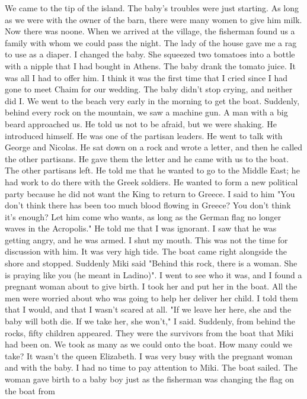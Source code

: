 We came to the tip of the island.
The baby's troubles were 
just starting.
As long as we were with the owner of the barn, there 
were many women to give him milk.
Now there was noone.
When we arrived 
at the village, the fisherman found us a family with whom we could pass 
the night.
The lady of the house gave me a rag to use as a diaper.
I 
changed the baby.
She squeezed two tomatoes into a bottle with a nipple 
that I had bought in Athens.
The baby drank the tomato juice.
It was all 
I had to offer him.
I think it was the first time that I cried since I 
had gone to meet Chaim for our wedding.
The baby didn't stop crying, and 
neither did I. 
We went to the beach very early in the morning to get the boat.
Suddenly, behind every rock on the mountain, we saw a machine gun.
A man with 
a big beard approached us.
He told us not to be afraid, but we were shaking.
He introduced himself.
He was one of the partisan leaders.
He went to talk with George and Nicolas.
He sat down on a rock and wrote a letter, and then he called the other partisans.
He gave them the letter 
and he came with us to the boat.
The other partisans left.
He told me that he wanted to go to the Middle East; he had work to do 
there with the Greek soldiers.
He wanted to form a new political party 
because he did not want the King to return to Greece.
I said to him "You 
don't think there has been too much blood flowing in Greece?
You don't 
think it's enough?
Let him come who wants, as long as the German flag no 
longer waves in the Acropolis."
He told me that I was ignorant.
I saw 
that he was getting angry, and he was armed.
I shut my mouth.
This was 
not the time for discussion with him.
It was very high tide.
The boat came right alongside the shore 
and stopped.
Suddenly Miki said "Behind this rock, there is a woman.
She 
is praying like you (he meant in Ladino)".
I went to see who it was, and 
I found a pregnant woman about to give birth.
I took her and put her in 
the boat.
All the men were worried about who was going to help her deliver her child.
I told them that I would, and that I wasn’t scared at all.
"If we leave her here, she and the baby will both die.
If we take her, she won't," I said.
Suddenly, from behind the rocks, fifty children appeared.
They were the survivors from the boat that Miki had been 
on.
We took as many as we could onto the boat.
How many could we take?
It wasn't the queen Elizabeth.
I was very busy with the pregnant woman and with the baby.
I had no 
time to pay attention to Miki.
The boat sailed.
The woman gave birth 
to a baby boy just as the fisherman was changing the flag on the boat from 
